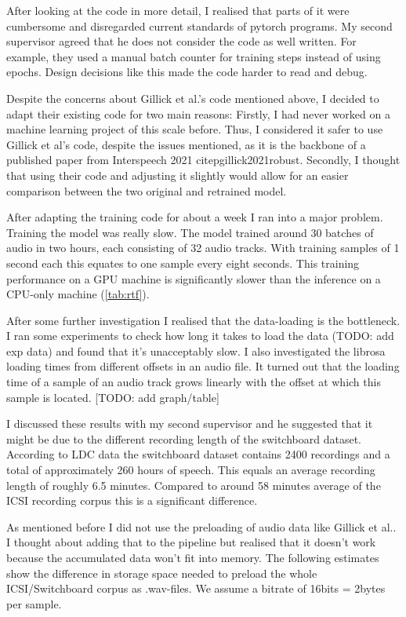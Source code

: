 \documentclass[bsc,frontabs,parskip,deptreport]{infthesis}
\begin{document}
After looking at the code in more detail, I realised that parts of it were cumbersome and disregarded current standards of pytorch programs. 
My second supervisor agreed that he does not consider the code as well written.
For example, they used a manual batch counter for training steps instead of using epochs.  
Design decisions like this made the code harder to read and debug. 

Despite the concerns about Gillick et al.'s code mentioned above, I decided to adapt their existing code for two main reasons:
Firstly, I had never worked on a machine learning project of this scale before. Thus, I considered it safer to use Gillick et al's code, despite the issues mentioned, as it is the backbone of a published paper from Interspeech 2021 citep{gillick2021robust}. 
Secondly, I thought that using their code and adjusting it slightly would allow for an easier comparison between the two original and retrained model. 

After adapting the training code for about a week I ran into a major problem. Training the model was really slow. The model trained around 30 batches of audio in two hours, each consisting of 32 audio tracks. 
With training samples of 1 second each this equates to one sample every eight seconds.
This training performance on a GPU machine is significantly slower than the inference on a CPU-only machine (\autoref{tab:rtf}).

After some further investigation I realised that the data-loading is the bottleneck. I ran some experiments to check how long it takes to load the data (TODO: add exp data) and found that it's unacceptably slow. 
I also investigated the librosa loading times from different offsets in an audio file. It turned out that the loading time of a sample of an audio track grows linearly with the offset at which this sample is located. [TODO: add graph/table]

I discussed these results with my second supervisor and he suggested that it might be due to the different recording length of the switchboard dataset. According to LDC data \citep{switchboard-ldc} the switchboard dataset contains 2400 recordings and a total of approximately 260 hours of speech. This equals an average recording length of roughly 6.5 minutes. Compared to around 58 minutes average of the ICSI recording corpus \citep{icsi-ldc} this is a significant difference.


As mentioned before I did not use the preloading of audio data like Gillick et al.. 
I thought about adding that to the pipeline but realised that it doesn't work because the accumulated data won't fit into memory. 
The following estimates show the difference in storage space needed to preload the whole ICSI/Switchboard corpus as .wav-files. We assume a bitrate of 16bits = 2bytes per sample.
\end{document}
